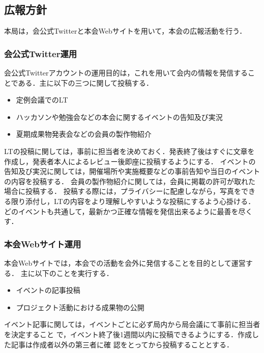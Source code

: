 \subsection*{広報方針}

本局は，会公式Twitterと本会Webサイトを用いて，本会の広報活動を行う．

\subsubsection*{会公式Twitter運用}
会公式Twitterアカウントの運用目的は，これを用いて会内の情報を発信することである．主に以下の三つに関して投稿する．
\begin{itemize}
    \item 定例会議でのLT
    \item ハッカソンや勉強会などの本会に関するイベントの告知及び実況
    \item 夏期成果物発表会などの会員の製作物紹介
\end{itemize}

LTの投稿に関しては，事前に担当者を決めておく．発表終了後はすぐに文章を作成し，発表者本人によるレビュー後即座に投稿するようにする．
イベントの告知及び実況に関しては，開催場所や実施概要などの事前告知や当日のイベントの内容を投稿する．
会員の製作物紹介に関しては，会員に掲載の許可が取れた場合に投稿する．
投稿する際には，プライバシーに配慮しながら，写真をできる限り添付し，LTの内容をより理解しやすいような投稿にするよう心掛ける．
どのイベントも共通して，最新かつ正確な情報を発信出来るように最善を尽くす．

\subsubsection*{本会Webサイト運用}
本会Webサイトでは，本会での活動を会外に発信することを目的として運営する．
主に以下のことを実行する．
\begin{itemize}
    \item イベントの記事投稿
    \item プロジェクト活動における成果物の公開
\end{itemize}

イベント記事に関しては，イベントごとに必ず局内から局会議にて事前に担当者を決定すること
で，イベント終了後1週間以内に投稿できるようにする．作成した記事は作成者以外の第三者に確
認をとってから投稿することとする．